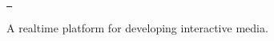 \label{index_md_README}%
%
\href{https://github.com/mxtt-mmxix/silicon/actions/workflows/cmake.yml}{\texttt{ }}

A realtime platform for developing interactive media. 